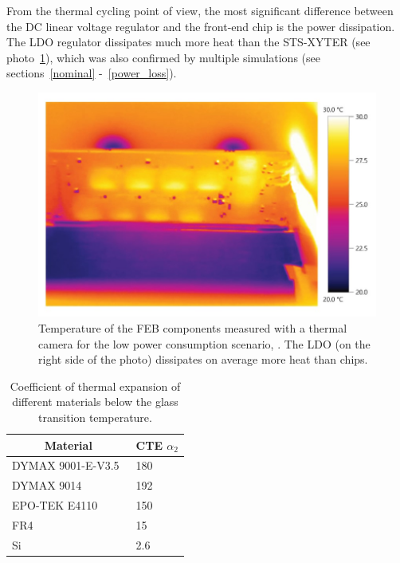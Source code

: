 From the thermal cycling point of view, the most significant difference between the DC linear voltage regulator and the front-end chip is the power dissipation. The \gls{LDO} regulator dissipates much more heat than the STS-XYTER (see photo~\ref{fig_temperatures_camera}), which was also confirmed by multiple simulations (see sections~\ref{nominal} -~\ref{power_loss}).

\begin{figure}[!h]
\centering
\includegraphics[width=0.6\columnwidth]{Chapter4/images/feb_thermal.jpg}
\caption{Temperature of the \gls{FEB} components measured with a thermal camera for the low power consumption scenario, \cite{leo_electronics}. The \gls{LDO} (on the right side of the photo) dissipates on average more heat than chips.}
\label{fig_temperatures_camera}
\end{figure}


\begin{table}[!h]
\begin{center}
\caption{Coefficient of thermal expansion of different materials below the glass transition temperature.}
\begin{tabular}{ll}
\hline
\multicolumn{1}{c}{Material} & \multicolumn{1}{c}{CTE $\alpha_{2}$} [\si{\micro\metre\per\metre\per\celsius]}] \\ \hline
DYMAX 9001-E-V3.5~\cite{9001}            & 180                                  \\
DYMAX 9014~\cite{9014}                   & 192                                  \\
EPO-TEK E4110~\cite{4110}                & 150                                  \\ \hline
FR4~\cite{FR4}                          & 15                                   \\
Si~\cite{Si}                           & 2.6                                 
\end{tabular}
\label{TCE}
\end{center}
\end{table}


